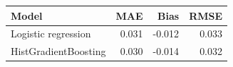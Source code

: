\begin{tabular}{lrrr}
\toprule
Model & MAE & Bias & RMSE \\
\midrule
Logistic regression & 0.031 & -0.012 & 0.033 \\
HistGradientBoosting & 0.030 & -0.014 & 0.032 \\
\bottomrule
\end{tabular}
